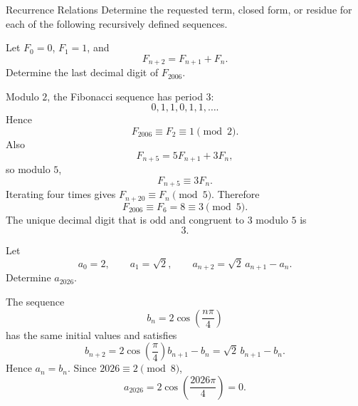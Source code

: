     \begin{expectedproblemgroup}{Recurrence Relations}
        Determine the requested term, closed form, or residue for each of the
        following recursively defined sequences.

        \begin{expectedsubproblem}[2006 VTRMC]
            Let $F_0=0$, $F_1=1$, and
            \[
                F_{n+2}=F_{n+1}+F_n.
            \]
            Determine the last decimal digit of $F_{2006}$.
        \end{expectedsubproblem}

        \begin{expectedsubsolution}
            Modulo $2$, the Fibonacci sequence has period $3$:
            \[
                0,1,1,0,1,1,\ldots.
            \]
            Hence
            \[
                F_{2006}\equiv F_2\equiv1\pmod2.
            \]
            Also
            \[
                F_{n+5}=5F_{n+1}+3F_n,
            \]
            so modulo $5$,
            \[
                F_{n+5}\equiv3F_n.
            \]
            Iterating four times gives $F_{n+20}\equiv F_n\pmod5$. Therefore
            \[
                F_{2006}\equiv F_6=8\equiv3\pmod5.
            \]
            The unique decimal digit that is odd and congruent to $3$ modulo $5$ is
            \[
                \boxed{3}.
            \]
        \end{expectedsubsolution}

        \begin{expectedsubproblem}
            Let
            \[
                a_0=2,
                \qquad
                a_1=\sqrt2,
                \qquad
                a_{n+2}=\sqrt2\,a_{n+1}-a_n.
            \]
            Determine $a_{2026}$.
        \end{expectedsubproblem}

        \begin{expectedsubsolution}
            The sequence
            \[
                b_n=2\cos\left(\frac{n\pi}{4}\right)
            \]
            has the same initial values and satisfies
            \[
                b_{n+2}
                =
                2\cos\left(\frac{\pi}{4}\right)b_{n+1}-b_n
                =
                \sqrt2\,b_{n+1}-b_n.
            \]
            Hence $a_n=b_n$. Since $2026\equiv2\pmod8$,
            \[
                \boxed{
                    a_{2026}
                    =
                    2\cos\left(\frac{2026\pi}{4}\right)
                    =0
                }.
            \]
        \end{expectedsubsolution}


\end{expectedproblemgroup}
